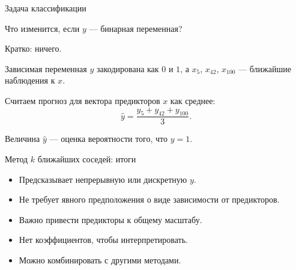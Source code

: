 \begin{frame}{Задача классификации}


Что изменится, если $y$ — \alert{бинарная} переменная?  
\pause

Кратко: \alert{ничего}.

\pause
Зависимая переменная $y$ закодирована как $0$ и $1$, 
а $x_5$, $x_{42}$, $x_{100}$ — ближайшие наблюдения к $x$.


Считаем прогноз для вектора предикторов $x$ как среднее:
\[
\hat y = \frac{y_5 + y_{42} + y_{100}}{3}.
\]

\pause

Величина $\hat y$ — \alert{оценка вероятности} того, что $y = 1$.

\end{frame}

\begin{frame}{Метод $k$ ближайших соседей: итоги}

  \begin{itemize}[<+->]
    \item Предсказывает непрерывную или дискретную $y$.
    \item Не требует явного предположения \alert{о виде зависимости} от предикторов.
    \item Важно привести \alert{предикторы к общему масштабу}.
    \item \alert{Нет коэффициентов}, чтобы интерпретировать. 
    \item Можно комбинировать с другими методами.
  \end{itemize}
\end{frame}

